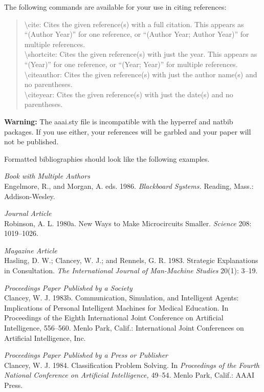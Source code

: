 \documentclass[letterpaper]{article}
\begin{document}
The following commands are available for your use in citing references:
\begin{quote}
\begin{small}
\textbackslash cite: Cites the given reference(s) with a full citation. This appears as ``(Author Year)'' for one reference, or ``(Author Year; Author Year)'' for multiple references.\\
\textbackslash shortcite: Cites the given reference(s) with just the year. This appears as ``(Year)'' for one reference, or ``(Year; Year)'' for multiple references.\\
\textbackslash citeauthor: Cites the given reference(s) with just the author name(s) and no parentheses.\\
\textbackslash citeyear: Cites the given reference(s) with just the date(s) and no parentheses.
\end{small}
\end{quote}

\textbf{Warning:} The aaai.sty file is incompatible with the hyperref and natbib packages. If you use either, your references will be garbled and your paper will not be published.

Formatted bibliographies should look like the following examples.

\smallskip \noindent \textit{Book with Multiple Authors}\\
Engelmore, R., and Morgan, A. eds. 1986. \textit{Blackboard Systems.} Reading, Mass.: Addison-Wesley.

\smallskip \noindent \textit{Journal Article}\\
Robinson, A. L. 1980a. New Ways to Make Microcircuits Smaller. \textit{Science} 208: 1019--1026.

\smallskip \noindent \textit{Magazine Article}\\
Hasling, D. W.; Clancey, W. J.; and Rennels, G. R. 1983. Strategic Explanations in Consultation. \textit{The International Journal of Man-Machine Studies} 20(1): 3--19.

\smallskip \noindent \textit{Proceedings Paper Published by a Society}\\
Clancey, W. J. 1983b. Communication, Simulation, and Intelligent Agents: Implications of Personal Intelligent Machines for Medical Education. In Proceedings of the Eighth International Joint Conference on Artificial Intelligence, 556--560. Menlo Park, Calif.: International Joint Conferences on Artificial Intelligence, Inc.

\smallskip \noindent \textit{Proceedings Paper Published by a Press or Publisher}\\
Clancey, W. J. 1984. Classification Problem Solving. In \textit{Proceedings of the Fourth National Conference on Artificial Intelligence,} 49--54. Menlo Park, Calif.: AAAI Press. 
\end{document}
